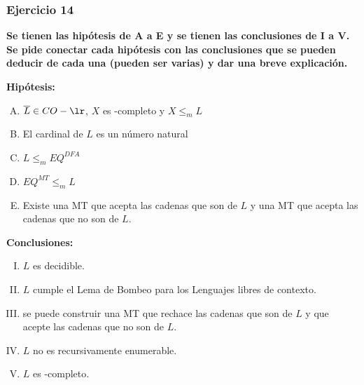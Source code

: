 \documentclass{article}
\begin{document}
% 
 \subsubsection*{Ejercicio 14} \textbf{Se tienen las hipótesis de A a E  y se tienen las  conclusiones de I a V. Se pide conectar cada hipótesis con las conclusiones que se pueden deducir de cada una (pueden ser varias) y dar una breve explicación.}

\textbf{Hipótesis:}

\begin{enumerate}[A.]
\item $\overline{L} \in CO-\lr$, $X$ es \lr-completo y $X \le_m  L$
\item El cardinal de $L$ es un número natural
\item $L \le_m  EQ^{DFA}$  
\item $EQ^{MT} \le_m L$ 


\item Existe una MT que acepta las cadenas que son de $L$ y una MT que acepta las cadenas que no son de $L$. 
\end{enumerate}

\textbf{Conclusiones:}

\begin{enumerate}[I.]
\item $L$ es  decidible.
\item $L$ cumple el Lema de Bombeo para los Lenguajes  libres de contexto.
\item se puede construir una MT que rechace las cadenas que son de $L$ y que acepte las cadenas que no son de $L$.

\item $L$ no es recursivamente enumerable.
\item $L$ es \lr-completo. 

\end{enumerate}
\end{document}

